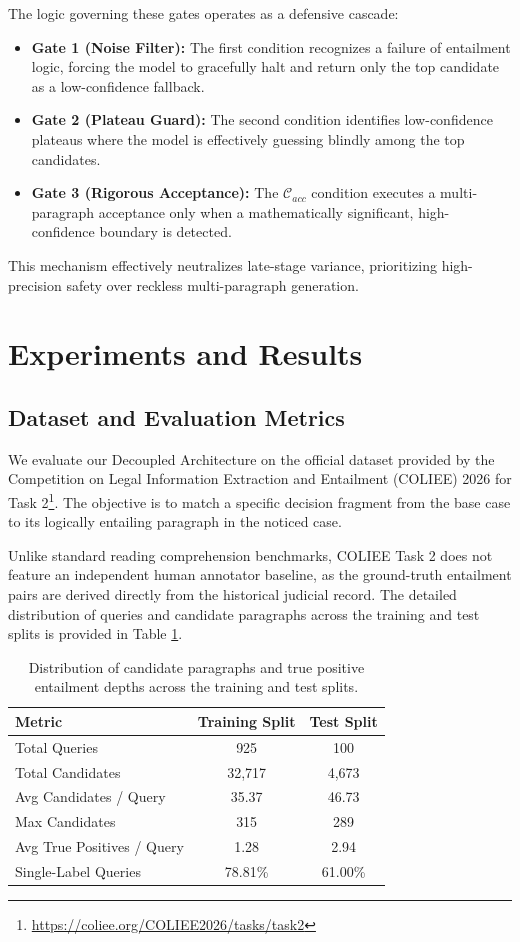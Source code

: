 \documentclass[sigconf]{acmart}
\begin{document}
The logic governing these gates operates as a defensive cascade:
\begin{itemize}
    \item \textbf{Gate 1 (Noise Filter):} The first condition recognizes a failure of entailment logic, forcing the model to gracefully halt and return only the top candidate as a low-confidence fallback.
    \item \textbf{Gate 2 (Plateau Guard):} The second condition identifies low-confidence plateaus where the model is effectively guessing blindly among the top candidates.
    \item \textbf{Gate 3 (Rigorous Acceptance):} The $\mathcal{C}_{acc}$ condition executes a multi-paragraph acceptance only when a mathematically significant, high-confidence boundary is detected.
\end{itemize}
This mechanism effectively neutralizes late-stage variance, prioritizing high-precision safety over reckless multi-paragraph generation.

\section{Experiments and Results}

\subsection{Dataset and Evaluation Metrics}

We evaluate our Decoupled Architecture on the official dataset provided by the Competition on Legal Information Extraction and Entailment (COLIEE) 2026 for Task 2\footnote{\url{https://coliee.org/COLIEE2026/tasks/task2}}. The objective is to match a specific decision fragment from the base case to its logically entailing paragraph in the noticed case. 

Unlike standard reading comprehension benchmarks, COLIEE Task 2 does not feature an independent human annotator baseline, as the ground-truth entailment pairs are derived directly from the historical judicial record. The detailed distribution of queries and candidate paragraphs across the training and test splits is provided in Table \ref{tab:dataset_dist}.

\begin{table}[h]
  \caption{Distribution of candidate paragraphs and true positive entailment depths across the training and test splits.}
  \label{tab:dataset_dist}
  \begin{tabular}{@{}l c c@{}}
    \toprule
    \textbf{Metric} & \textbf{Training Split} & \textbf{Test Split} \\
    \midrule
    Total Queries & 925 & 100 \\
    Total Candidates & 32,717 & 4,673 \\
    Avg Candidates / Query & 35.37 & 46.73 \\
    Max Candidates & 315 & 289 \\
    Avg True Positives / Query & 1.28 & 2.94 \\
    Single-Label Queries & 78.81\% & 61.00\% \\
  \bottomrule
\end{tabular}
\end{table}
\end{document}
